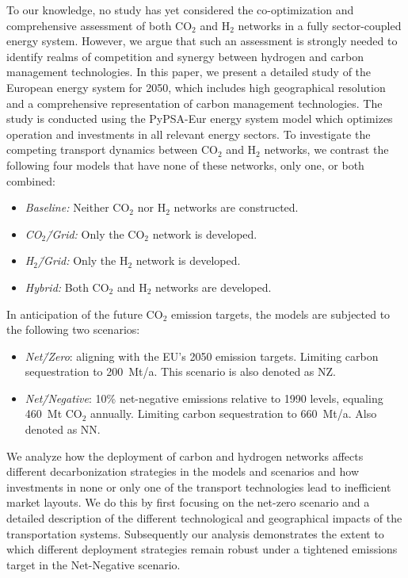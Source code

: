 \documentclass[twocolumn]{article}
\newcommand{\COtwo}{CO$_2$}
\newcommand{\Htwo}{H$_2$}
\newcommand{\COgrid}{CO$_2$\=/Grid}
\newcommand{\Hgrid}{H$_2$\=/Grid}
\newcommand{\carbon}{CO$_2$}
\begin{document}
To our knowledge, no study has yet considered the co-optimization and comprehensive assessment of both \COtwo{} and \Htwo{} networks in a fully sector-coupled energy system. However, we argue that such an assessment is strongly needed to identify realms of competition and synergy between hydrogen and carbon management technologies. In this paper, we present a detailed study of the European energy system for 2050, which includes high geographical resolution and a comprehensive representation of carbon management technologies. The study is conducted using the PyPSA-Eur energy system model which optimizes operation and investments in all relevant energy sectors. To investigate the competing transport dynamics between \COtwo{} and \Htwo{} networks, we contrast the following four models that have none of these networks, only one, or both combined:
%
\begin{itemize}
    \item[] \textit{Baseline:} Neither \COtwo{} nor \Htwo{} networks are constructed.
    \item[] \textit{\COgrid{}:} Only the \COtwo{} network is developed.
    \item[] \textit{\Hgrid{}:} Only the \Htwo{} network is developed.
    \item[] \textit{Hybrid:} Both \COtwo{} and \Htwo{} networks are developed.
\end{itemize}
%
In anticipation of the future \carbon{} emission targets, the models are subjected to the following two scenarios:
\begin{itemize}
    \item[] \textit{Net\=/Zero}: aligning with the EU's 2050 emission targets. Limiting carbon sequestration to 200~Mt/a. This scenario is also denoted as NZ.
    \item[] \textit{Net\=/Negative}: 10\% net-negative emissions relative to 1990 levels, equaling 460~Mt \COtwo{} annually. Limiting carbon sequestration to 660~Mt/a. Also denoted as NN.
\end{itemize}

We analyze how the deployment of carbon and hydrogen networks affects different decarbonization strategies in the models and scenarios and how investments in none or only one of the transport technologies lead to inefficient market layouts. We do this by first focusing on the net-zero scenario and a detailed description of the different technological and geographical impacts of the transportation systems. Subsequently our analysis demonstrates the extent to which different deployment strategies remain robust under a tightened emissions target in the Net-Negative scenario.
\end{document}

